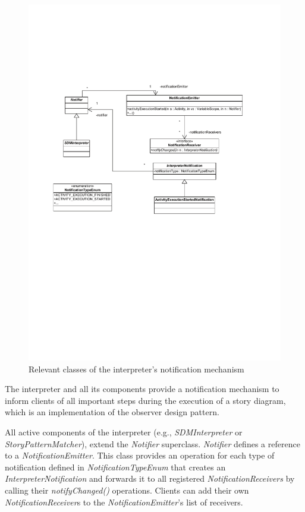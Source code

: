 \begin{figure}
\includegraphics[width=1.0\columnwidth]{figures/interpreter_metamodel_facades.pdf} 
\caption{Relevant classes of the interpreter's notification mechanism}
\end{figure}

The interpreter and all its components provide a notification mechanism to inform clients of all important steps during the execution of a story diagram, which is an implementation of the observer design pattern.

All active components of the interpreter (e.g., \emph{SDMInterpreter} or \emph{StoryPatternMatcher}), extend the \emph{Notifier} superclass.
\emph{Notifier} defines a reference to a \emph{NotificationEmitter}. 
This class provides an operation for each type of notification defined in \emph{NotificationTypeEnum} that creates an \emph{InterpreterNotification} and forwards it to all registered \emph{NotificationReceivers} by calling their \emph{notifyChanged()} operations. 
Clients can add their own \emph{NotificationReceiver}s to the \emph{NotificationEmitter}'s list of receivers.

